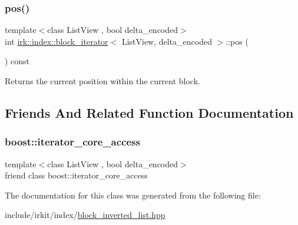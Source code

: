\subsubsection{\texorpdfstring{pos()}{pos()}}
{\footnotesize\ttfamily template$<$class List\+View , bool delta\+\_\+encoded$>$ \\
int \mbox{\hyperlink{classirk_1_1index_1_1block__iterator}{irk\+::index\+::block\+\_\+iterator}}$<$ List\+View, delta\+\_\+encoded $>$\+::pos (\begin{DoxyParamCaption}{ }\end{DoxyParamCaption}) const\hspace{0.3cm}{\ttfamily [inline]}}



Returns the current position within the current block. 



\subsection{Friends And Related Function Documentation}
\mbox{\label{classirk_1_1index_1_1block__iterator_ac09f73e325921cc50ebcd96bed0f8096}} 
\subsubsection{\texorpdfstring{boost\+::iterator\+\_\+core\+\_\+access}{boost::iterator\_core\_access}}
{\footnotesize\ttfamily template$<$class List\+View , bool delta\+\_\+encoded$>$ \\
friend class boost\+::iterator\+\_\+core\+\_\+access\hspace{0.3cm}{\ttfamily [friend]}}



The documentation for this class was generated from the following file\+:\begin{DoxyCompactItemize}
\item 
include/irkit/index/\mbox{\hyperlink{block__inverted__list_8hpp}{block\+\_\+inverted\+\_\+list.\+hpp}}\end{DoxyCompactItemize}

